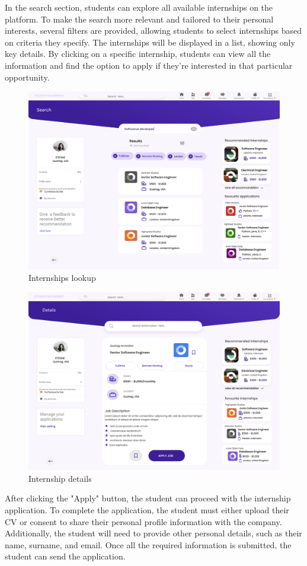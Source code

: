 In the search section, students can explore all available internships on the platform. To make the search more relevant and tailored to their personal interests, several filters are provided, allowing students to select internships based on criteria they specify. The internships will be displayed in a list, showing only key details. By clicking on a specific internship, students can view all the information and find the option to apply if they're interested in that particular opportunity.

\begin{figure} [H]
    \centering
    \includegraphics[width=0.5\linewidth]{Images/Interface Images/student interface/Screenshot 2024-12-12 045606.png}
    \caption{Internships lookup}
    \label{fig: Internships lookup}
\end{figure}

\begin{figure} [H]
    \centering
    \includegraphics[width=0.5\linewidth]{Images/Interface Images/student interface/Screenshot 2024-12-12 045619.png}
    \caption{Internship details}
    \label{fig:Internship details}
\end{figure}

After clicking the "Apply" button, the student can proceed with the internship application. To complete the application, the student must either upload their CV or consent to share their personal profile information with the company. Additionally, the student will need to provide other personal details, such as their name, surname, and email. Once all the required information is submitted, the student can send the application.

